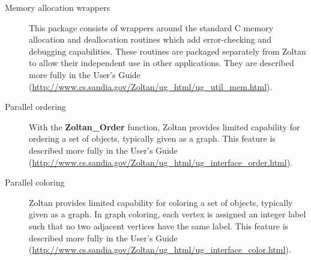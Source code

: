 \begin{description}
\item [Memory allocation wrappers]
This package consists of wrappers around the standard C memory allocation and 
deallocation routines which add error-checking and debugging capabilities. These 
routines are packaged separately from Zoltan to allow their independent use in other 
applications. 
They are described more fully in the User's Guide
(\url{http://www.cs.sandia.gov/Zoltan/ug\_html/ug\_util\_mem.html}).

\item [Parallel ordering]
With the \textbf{Zoltan\_Order} function,
Zoltan provides limited capability for ordering a set of objects, typically 
given as a graph.
This feature is described more fully in the User's Guide
(\url{http://www.cs.sandia.gov/Zoltan/ug\_html/ug\_interface\_order.html}).

\item [Parallel coloring]
Zoltan provides limited capability for coloring a set of objects, typically given 
as a graph. In graph coloring, each vertex is assigned an integer label such 
that no two adjacent vertices have the same label. 
This feature is described more fully in the User's Guide
(\url{http://www.cs.sandia.gov/Zoltan/ug\_html/ug\_interface\_color.html}).
\end{description}

